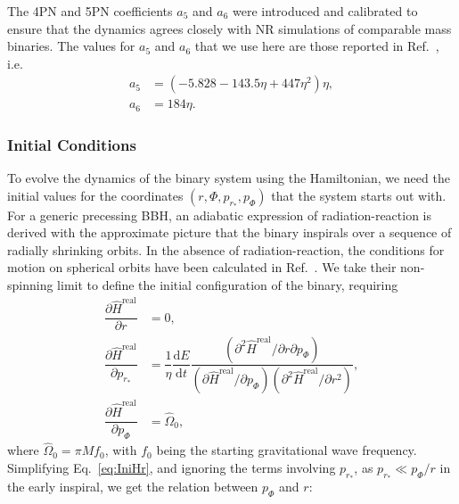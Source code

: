 \documentclass[aps,
prd,
amsmath,
amssymb,
twocolumn,
floatfix,
groupedaddress]{revtex4-1}
\newcommand{\D}{\mathrm{d}}
\newcommand{\real}{\mathrm{real}}
\begin{document}
The 4PN and 5PN coefficients $a_5$ and $a_6$ were introduced and calibrated \citep{EOBNRdevel01,EOBNRdevel02,EOBNRdevel03,EOBNRdevel04} to ensure that the dynamics agrees closely with NR simulations of comparable mass binaries. The values for $a_5$ and $a_6$ that we use here are those reported in Ref.~\citep{BuonannoEOBv2Main}, i.e.
\begin{subequations}\label{metric_tunable_coeffs}
\begin{align}
a_5 &= \left(-5.828 - 143.5\eta + 447\eta^2\right)\eta ,\\
a_6 &= 184\eta .
\end{align}
\end{subequations}


\subsubsection{Initial Conditions}\label{sec:level3:EOBNRv2:IniCond}
To evolve the dynamics of the binary system using the Hamiltonian, we need the initial values for the coordinates $(r,\Phi,p_{r_*},p_{\Phi})$ that the system starts out with. For a generic precessing BBH, an adiabatic expression of radiation-reaction is derived with the approximate picture that the binary inspirals over a sequence of radially shrinking orbits. In the absence of radiation-reaction, the conditions for motion on spherical orbits have been calculated in Ref.~\cite{IniConditions-precessing}. We take their non-spinning limit to define the initial configuration of the binary, requiring
\begin{subequations}
\begin{align}\label{eq:IniHr}
\dfrac{\partial\hat{H}^{\real}}{\partial r} &= 0,\\ \label{eq:IniHpr}
\dfrac{\partial\hat{H}^{\real}}{\partial p_{r_*}} &= \dfrac{1}{\eta}\dfrac{\D E}{\D t}\dfrac{(\partial^2\hat{H}^{\real}/\partial r\partial p_{\Phi} )}{(\partial\hat{H}^{\real}/\partial p_{\Phi})(\partial^2\hat{H}^{\real}/\partial r^2)}, \\\label{eq:IniHpphi}
\dfrac{\partial\hat{H}^{\real}}{\partial p_{\Phi}} &= \hat{\Omega}_0,
\end{align}
\end{subequations}
where $\hat{\Omega}_0 = \pi Mf_0$, with $f_0$ being the starting gravitational wave frequency. Simplifying Eq.~\eqref{eq:IniHr}, and ignoring the terms involving $p_{r_*}$, as $p_{r_*}\ll p_{\Phi}/r$ in the early inspiral, we get the relation between $p_{\Phi}$ and $r$:
\end{document}
